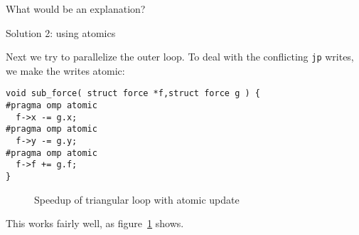 \begin{comment}
\begin{verbatim}
================ #threads = 1 ================
               Sequential: 2.029093e+01; 
       Full loop Parallel: 3.118345e+00; speedup= 6.51
================ #threads = 18 ================
       Full loop Parallel: 1.940827e+00; speedup=10.46
================ #threads = 37 ================
       Full loop Parallel: 4.390490e+00; speedup= 4.63
================ #threads = 56 ================
       Full loop Parallel: 8.484191e+00; speedup= 2.40
\end{verbatim}
\end{comment}

\begin{exercise}
  What would be an explanation?
\end{exercise}

 {Solution 2: using atomics}

Next we try to parallelize the outer loop.
To deal with the conflicting \lstinline{jp} writes,
we make the writes atomic:
\begin{lstlisting}
void sub_force( struct force *f,struct force g ) {
#pragma omp atomic
  f->x -= g.x;
#pragma omp atomic
  f->y -= g.y;
#pragma omp atomic
  f->f += g.f;
}
\end{lstlisting}

\begin{figure}[t]
  \label{fig:omp-nbody2}
  \caption{Speedup of triangular loop with atomic update}
\end{figure}

This works fairly well, as figure~\ref{fig:omp-nbody2} shows.

